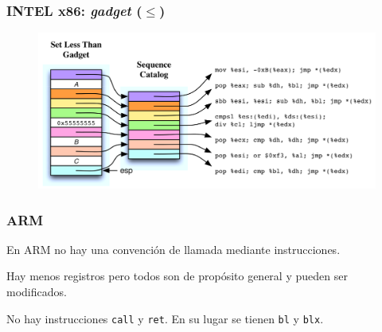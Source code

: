 \documentclass{beamer}
\newcommand { \vs } {\vspace{0.5cm}}
\begin{document}
\begin{frame}
    \frametitle{INTEL x86: \textit{gadget} ($\le$)}
    \begin{figure}
        \centering
        \includegraphics[scale=0.2]{gadgetx86.png}
    \end{figure}
\end{frame}

\begin{frame}
    \frametitle{ARM}

   En ARM no hay una convención de llamada mediante instrucciones.

    \vs

    Hay menos registros pero todos son de propósito general y pueden ser modificados.

    \vs

    No hay instrucciones \texttt{call} y \texttt{ret}. En su lugar se tienen \texttt{bl} y \texttt{blx}.

\end{frame}
\end{document}
